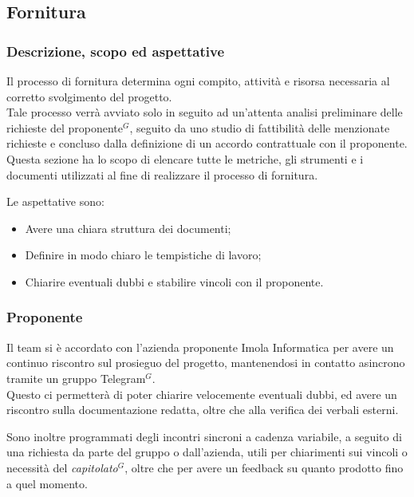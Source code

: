\subsection{Fornitura}

\subsubsection{Descrizione, scopo ed aspettative}

Il processo di fornitura determina ogni compito, attività e risorsa necessaria al corretto svolgimento del progetto. \\
Tale processo verrà avviato solo in seguito ad un’attenta analisi preliminare delle richieste del proponente$^{G}$, seguito da uno studio di fattibilità delle menzionate
richieste e concluso dalla definizione di un accordo contrattuale con il proponente. \\

Questa sezione ha lo scopo di elencare tutte le metriche, gli strumenti e i documenti utilizzati al fine di realizzare il processo di fornitura.

Le aspettative sono:
\begin{itemize}
    \item Avere una chiara struttura dei documenti;
    \item Definire in modo chiaro le tempistiche di lavoro;
    \item Chiarire eventuali dubbi e stabilire vincoli con il proponente.
\end{itemize}
\subsubsection{Proponente}

Il team si è accordato con l'azienda proponente Imola Informatica per avere un continuo riscontro sul prosieguo del progetto, mantenendosi in contatto asincrono tramite un gruppo Telegram$^{G}$. \\
Questo ci permetterà di poter chiarire velocemente eventuali dubbi, ed avere un riscontro sulla documentazione redatta, oltre che alla verifica dei verbali esterni.

Sono inoltre programmati degli incontri sincroni a cadenza variabile, a seguito di una richiesta da parte del gruppo o dall'azienda, utili per chiarimenti sui vincoli o necessità del \emph{capitolato}$^{G}$, oltre che per avere un feedback su quanto prodotto fino a quel momento.




